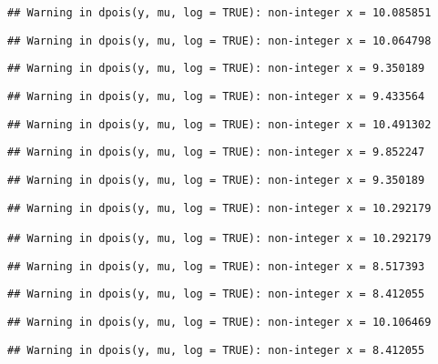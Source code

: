 \documentclass[
]{article}
\begin{document}
\begin{verbatim}
## Warning in dpois(y, mu, log = TRUE): non-integer x = 10.085851
\end{verbatim}

\begin{verbatim}
## Warning in dpois(y, mu, log = TRUE): non-integer x = 10.064798
\end{verbatim}

\begin{verbatim}
## Warning in dpois(y, mu, log = TRUE): non-integer x = 9.350189
\end{verbatim}

\begin{verbatim}
## Warning in dpois(y, mu, log = TRUE): non-integer x = 9.433564
\end{verbatim}

\begin{verbatim}
## Warning in dpois(y, mu, log = TRUE): non-integer x = 10.491302
\end{verbatim}

\begin{verbatim}
## Warning in dpois(y, mu, log = TRUE): non-integer x = 9.852247
\end{verbatim}

\begin{verbatim}
## Warning in dpois(y, mu, log = TRUE): non-integer x = 9.350189
\end{verbatim}

\begin{verbatim}
## Warning in dpois(y, mu, log = TRUE): non-integer x = 10.292179

## Warning in dpois(y, mu, log = TRUE): non-integer x = 10.292179
\end{verbatim}

\begin{verbatim}
## Warning in dpois(y, mu, log = TRUE): non-integer x = 8.517393
\end{verbatim}

\begin{verbatim}
## Warning in dpois(y, mu, log = TRUE): non-integer x = 8.412055
\end{verbatim}

\begin{verbatim}
## Warning in dpois(y, mu, log = TRUE): non-integer x = 10.106469
\end{verbatim}

\begin{verbatim}
## Warning in dpois(y, mu, log = TRUE): non-integer x = 8.412055
\end{verbatim}
\end{document}
